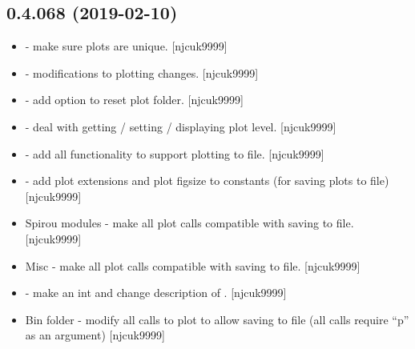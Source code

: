 \documentclass[a4paper,10pt,english]{report}
\begin{document}
\subsection{0.4.068 (2019-02-10)}
\label{\detokenize{misc/changelog:id189}}\begin{itemize}
\item {} 
 - make sure plots are unique. {[}njcuk9999{]}

\item {} 
 - modifications to plotting changes.
{[}njcuk9999{]}

\item {} 
 - add option to reset plot folder. {[}njcuk9999{]}

\item {} 
 - deal with getting / setting / displaying plot
level. {[}njcuk9999{]}

\item {} 
 - add all functionality to support plotting to file.
{[}njcuk9999{]}

\item {} 
 - add plot extensions and plot figsize to constants
(for saving plots to file) {[}njcuk9999{]}

\item {} 
Spirou modules - make all plot calls compatible with saving to file.
{[}njcuk9999{]}

\item {} 
Misc - make all plot calls compatible with saving to file. {[}njcuk9999{]}

\item {} 
 - make  an int and change description of
. {[}njcuk9999{]}

\item {} 
Bin folder - modify all calls to plot to allow saving to file (all
calls require “p” as an argument) {[}njcuk9999{]}

\end{itemize}
\end{document}
